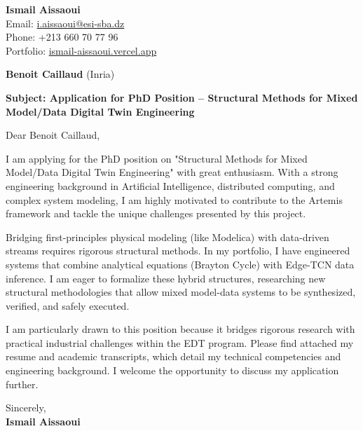 \documentclass[11pt,a4paper]{article}
\begin{document}
\thispagestyle{empty}

\begin{flushright}
\textbf{Ismail Aissaoui} \\
Email: \href{mailto:i.aissaoui@esi-sba.dz}{i.aissaoui@esi-sba.dz} \\
Phone: +213 660 70 77 96 \\
Portfolio: \href{https://ismail-aissaoui.vercel.app}{ismail-aissaoui.vercel.app}
\end{flushright}

\vspace{1em}

\begin{flushleft}
\textbf{Benoit Caillaud} (Inria)
\end{flushleft}

\vspace{1em}
\noindent\textbf{Subject: Application for PhD Position -- Structural Methods for Mixed Model/Data Digital Twin Engineering}
\vspace{1em}

\noindent Dear Benoit Caillaud,

\vspace{1em}
\noindent
I am applying for the PhD position on "Structural Methods for Mixed Model/Data Digital Twin Engineering" with great enthusiasm. With a strong engineering background in Artificial Intelligence, distributed computing, and complex system modeling, I am highly motivated to contribute to the Artemis framework and tackle the unique challenges presented by this project.

\vspace{0.5em}
\noindent
Bridging first-principles physical modeling (like Modelica) with data-driven streams requires rigorous structural methods. In my portfolio, I have engineered systems that combine analytical equations (Brayton Cycle) with Edge-TCN data inference. I am eager to formalize these hybrid structures, researching new structural methodologies that allow mixed model-data systems to be synthesized, verified, and safely executed.

\vspace{0.5em}
\noindent
I am particularly drawn to this position because it bridges rigorous research with practical industrial challenges within the EDT program. Please find attached my resume and academic transcripts, which detail my technical competencies and engineering background. I welcome the opportunity to discuss my application further.

\vspace{1.5em}
\noindent
Sincerely, \\[0.5em]
\textbf{Ismail Aissaoui}
\end{document}
